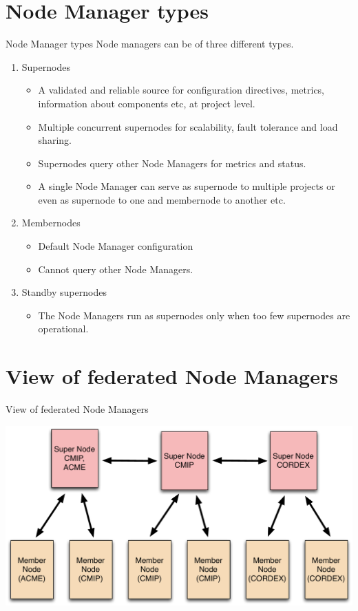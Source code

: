 \documentclass{beamer}
\begin{document}
\section{Node Manager types}
\begin{frame}{Node Manager types}
Node managers can be of three different types.
\begin{enumerate}
\item Supernodes
\begin{itemize}
\item A validated and reliable source for configuration directives, metrics, information about components etc, at project level.
\item Multiple concurrent supernodes for scalability, fault tolerance and load sharing.
\item Supernodes query other Node Managers for metrics and status.
\item A single Node Manager can serve as supernode to multiple projects or even as supernode to one and membernode to another etc.
\end{itemize}
\item Membernodes
\begin{itemize}
\item Default Node Manager configuration
\item Cannot query other Node Managers.
\end{itemize}
\item Standby supernodes
\begin{itemize}
\item The Node Managers run as supernodes only when too few supernodes are operational.
\end{itemize}
\end{enumerate}
\end{frame}

\section{View of federated Node Managers}
\begin{frame}{View of federated Node Managers}
\begin{center}
\includegraphics[scale=0.35]{ESG-node-org.pdf}
\end{center}
\end{frame}
\end{document}
